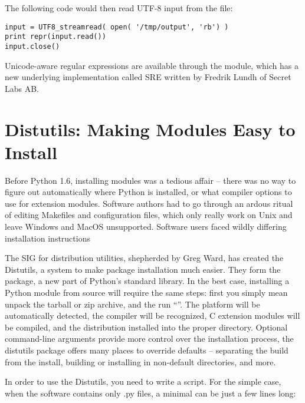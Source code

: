 \documentclass{howto}
\begin{document}
{The following code would then read UTF-8 input from the file:

\begin{verbatim}
input = UTF8_streamread( open( '/tmp/output', 'rb') )
print repr(input.read())
input.close()
\end{verbatim}

Unicode-aware regular expressions are available through the
 module, which has a new underlying implementation called
SRE written by Fredrik Lundh of Secret Labs AB. 


\section{Distutils: Making Modules Easy to Install}

Before Python 1.6, installing modules was a tedious affair -- there
was no way to figure out automatically where Python is installed, or
what compiler options to use for extension modules.  Software authors
had to go through an ardous ritual of editing Makefiles and
configuration files, which only really work on Unix and leave Windows
and MacOS unsupported.  Software users faced wildly differing
installation instructions 

The SIG for distribution utilities, shepherded by Greg Ward, has
created the Distutils, a system to make package installation much
easier.  They form the  package, a new part of
Python's standard library. In the best case, installing a Python
module from source will require the same steps: first you simply mean
unpack the tarball or zip archive, and the run ``''.  The platform will be automatically detected, the compiler
will be recognized, C extension modules will be compiled, and the
distribution installed into the proper directory.  Optional
command-line arguments provide more control over the installation
process, the distutils package offers many places to override defaults
-- separating the build from the install, building or installing in
non-default directories, and more.

In order to use the Distutils, you need to write a 
script.  For the simple case, when the software contains only .py
files, a minimal  can be just a few lines long:

}
\end{document}
